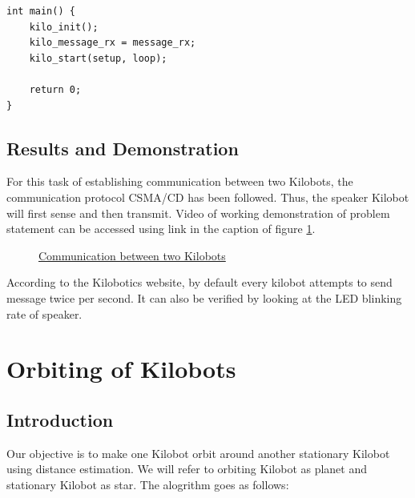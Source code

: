 \begin{verbatim}
int main() {
    kilo_init();
    kilo_message_rx = message_rx;
    kilo_start(setup, loop);

    return 0;
}
\end{verbatim}
\section{Results and Demonstration}
For this task of establishing communication between two Kilobots, the communication protocol CSMA/CD has been followed. Thus, the speaker Kilobot will first sense and then transmit. Video of working demonstration of problem statement can be accessed using link in the caption of figure \ref{fig:communication}.
\begin{figure}[H]
	\centering
	\caption{\href{https://photos.app.goo.gl/h2jCY1WrUYU9xLqG8}{Communication between two Kilobots}}
	\label{fig:communication}
\end{figure}
According to the Kilobotics website, by default every kilobot attempts to send message twice per second. It can also be verified by looking at the LED blinking rate of speaker. 

\chapter{Orbiting of Kilobots}
\section{Introduction}
Our objective is to make one Kilobot orbit around another stationary Kilobot using distance estimation. We will refer to orbiting Kilobot as planet and stationary Kilobot as star. The alogrithm goes as follows:

